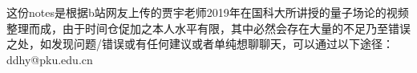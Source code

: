 \begin{cabstract}
这份notes是根据b站网友上传的贾宇老师2019年在国科大所讲授的量子场论的视频整理而成，由于时间仓促加之本人水平有限，其中必然会存在大量的不足乃至错误之处，如发现问题/错误或有任何建议或者单纯想聊聊天，可以通过以下途径：ddhy@pku.edu.cn
\end{cabstract}



